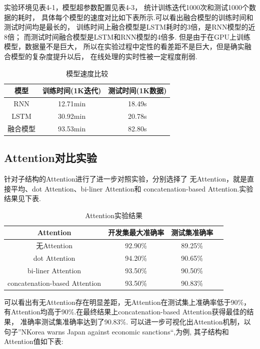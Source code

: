 \documentclass[bachelor,winfonts]{jnuthesis}
\begin{document}
实验环境见表4-1，模型超参数配置见表4-3，
统计训练迭代1000次和测试1000个数据的耗时，
具体每个模型的速度对比如下表所示.可以看出融合模型的训练时间和测试时间均是最长的，
训练时间上融合模型是LSTM耗时的3倍，是RNN模型的近8倍；
而测试时间融合模型是LSTM和RNN模型的4倍多.
但是由于在GPU上训练模型，数据量不是巨大，
所以在实验过程中定性的看差距不是巨大，但是确实融合模型的复杂度提升以后，
在线处理的实时性被一定程度削弱.

\begin{table}[h!]
  \centering
  \begin{tabular}{ccc}
    \toprule
    \textbf{模型} & \textbf{训练时间(1K迭代)} & \textbf{测试时间(1K数据)}\\
    \midrule
    RNN &  12.71min & 18.49s \\ 
    LSTM & 30.92min & 20.78s \\ 
    融合模型 & 93.53min & 82.80s \\ 
    \bottomrule
  \end{tabular}
  \caption{模型速度比较}
\end{table}


\subsection{Attention对比实验}
针对子结构的Attention进行了进一步对照实验，分别选择了
无Attention，就是直接平均、dot Attention、bi-liner Attention和
concatenation-based Attention.实验结果见下表.

\begin{table}[h!]
  \centering
  \begin{tabular}{cccc}
    \toprule
    \textbf{Attention} & \textbf{开发集最大准确率} & \textbf{测试集准确率} \\
    \midrule
    无Attention & 92.90\% & 89.25\% \\
    dot Attention & 94.20\% & 90.65\% \\ 
    bi-liner Attention & 93.50\% & 90.50\% \\
    concatenation-based Attention & 93.50\% & 90.83\% \\
    \bottomrule
  \end{tabular}
  \caption{Attention实验结果}
\end{table}

可以看出有无Attention存在明显差距，无Attention在测试集上准确率低于90\%，
有Attention均高于90\%.在最终结果上concatenation-based Attention获得最佳的结果，
准确率测试集准确率达到了90.83\%.
可以进一步可视化出Attention机制，以句子”NKorea warns Japan against economic sanctions“,为例,
其子结构和Attention值如下表:
\end{document}
